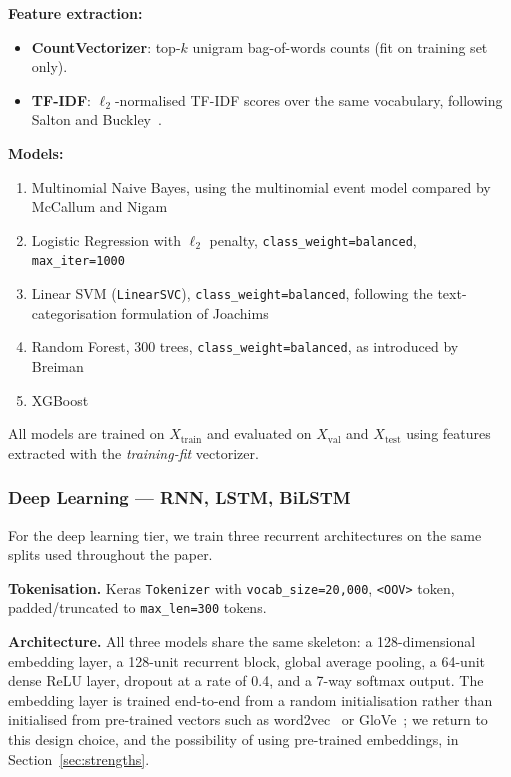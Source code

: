 \documentclass[11pt,a4paper]{article}
\begin{document}
\textbf{Feature extraction:}
\begin{itemize}
  \item \textbf{CountVectorizer}: top-$k$ unigram bag-of-words counts
        (fit on training set only).
  \item \textbf{TF-IDF}: $\ell_2$-normalised TF-IDF scores over the same
        vocabulary, following Salton and Buckley~\cite{salton1988term}.
\end{itemize}

\textbf{Models:}
\begin{enumerate}
  \item Multinomial Naive Bayes, using the multinomial event model compared
        by McCallum and Nigam~\cite{mccallum1998naive}
  \item Logistic Regression with $\ell_2$ penalty, \texttt{class\_weight=balanced},
        \texttt{max\_iter=1000}
  \item Linear SVM (\texttt{LinearSVC}), \texttt{class\_weight=balanced},
        following the text-categorisation formulation of
        Joachims~\cite{joachims1998text}
  \item Random Forest, 300 trees, \texttt{class\_weight=balanced}, as
        introduced by Breiman~\cite{breiman2001random}
  \item XGBoost~\cite{chen2016xgboost}
\end{enumerate}

All models are trained on $X_{\text{train}}$ and evaluated on $X_{\text{val}}$
and $X_{\text{test}}$ using features extracted with the \emph{training-fit}
vectorizer.

\subsubsection{Deep Learning --- RNN, LSTM, BiLSTM}

For the deep learning tier, we train three recurrent architectures on the
same splits used throughout the paper.

\textbf{Tokenisation.}
Keras \texttt{Tokenizer} with \texttt{vocab\_size=20{,}000}, \texttt{<OOV>}
token, padded/truncated to \texttt{max\_len=300} tokens.

\textbf{Architecture.} All three models share the same skeleton: a 128-dimensional
embedding layer, a 128-unit recurrent block, global average pooling, a
64-unit dense ReLU layer, dropout at a rate of 0.4, and a 7-way softmax
output. The embedding layer is trained end-to-end from a random initialisation
rather than initialised from pre-trained vectors such as word2vec~\cite{mikolov2013efficient}
or GloVe~\cite{pennington2014glove}; we return to this design choice, and the
possibility of using pre-trained embeddings, in Section~\ref{sec:strengths}.
\end{document}
